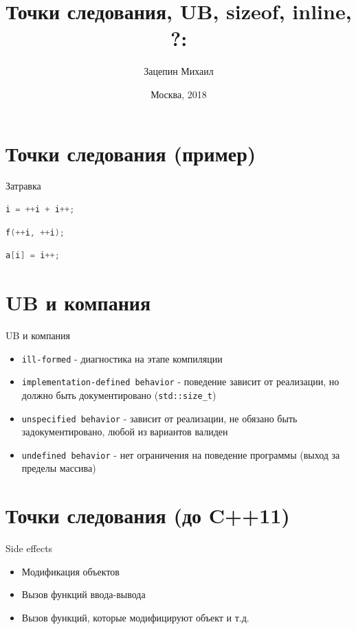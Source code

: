\documentclass[10pt]{beamer}
\title[\href{https://goo.gl/NRgp8K}{https://goo.gl/NRgp8K} (Term 3)]{Точки следования, UB, sizeof, inline, ?: }
\author[Зацепин Михаил]{Зацепин Михаил}
\institute[МФТИ] 
{Московский физико-технический институт\\*}
\date{Москва, 2018}
\begin{document}
\begin{frame}
  \titlepage
\end{frame}

\section{Точки следования (пример)}
\begin{frame}[fragile]{Затравка}
\begin{lstlisting}[language=C++]
    i = ++i + i++;
\end{lstlisting}
    \pause
\begin{lstlisting}[language=C++]
    f(++i, ++i);
\end{lstlisting}
    \pause
\begin{lstlisting}[language=C++]
    a[i] = i++;
\end{lstlisting}
\end{frame}

\section{UB и компания}
\begin{frame}{UB и компания}
\begin{itemize}
\item{\texttt{ill-formed} - диагностика на этапе компиляции}
\item{\texttt{implementation-defined behavior} - поведение зависит от реализации, но должно быть документировано (\texttt{std::size\_t})}
\item{\texttt{unspecified behavior} - зависит от реализации, не обязано быть задокументировано, любой из вариантов валиден}
\item{\texttt{undefined behavior} - нет ограничения на поведение программы (выход за пределы массива)}
\end{itemize}
\end{frame}

\section{Точки следования (до C++11)}
\begin{frame}{Side effects}
\begin{itemize}
\item{Модификация объектов}
\item{Вызов функций ввода-вывода}
\item{Вызов функций, которые модифицируют объект и т.д.}
\end{itemize}
\end{frame}
\end{document}
